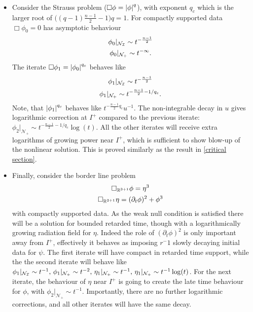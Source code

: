 \documentclass[11pt, oneside]{amsart}
\begin{document}
\begin{itemize}
		\item Consider the Strauss problem ($\Box\phi=\left\lvert \phi\right\rvert^q$), with exponent $q_c$ which is the larger root of ${\big((q-1)\frac{n-1}{2}-1\big)q=1}$. For compactly supported data $\Box\phi_0=0$ has asymptotic behaviour 
		\begin{equation*}
			\begin{gathered}
				\phi_0|_{\mathcal{N}_{\mathcal{I}}}\sim t^{-\frac{n-1}{2}}\\
				\phi_0|_{\mathcal{N}_+}\sim t^{-\infty}.
			\end{gathered}
		\end{equation*}
		The iterate $\Box\phi_1=\left\lvert \phi_0\right\rvert^{q_c}$ behaves like
		\begin{equation*}
			\begin{gathered}
				\phi_1|_{\mathcal{N}_{\mathcal{I}}}\sim t^{-\frac{n-1}{2}}\\
				\phi_1|_{\mathcal{N}_+}\sim t^{-\frac{n-1}{2}-1/q_c}.
			\end{gathered}
		\end{equation*}
		Note, that $\left\lvert \phi_1\right\rvert^{q_c}$ behaves like $t^{-\frac{n-1}{2}q_c}u^{-1}$. The non-integrable decay in $u$ gives logarithmic correction at $I^+$ compared to the previous iterate: $\phi_2|_{\mathcal{N}_+}\sim t^{-\frac{n-1}{2}-1/q_c}\log(t)$.  All the other iterates will receive extra logarithms of growing power near $I^+$, which is sufficient to show blow-up of the nonlinear solution. This is proved similarly as the result in \cref{critical section}.
		\item  Finally, consider the border line problem
		\begin{equation*}
			\begin{gathered}
				\Box_{\mathbb{R}^{3+1}}\phi=\eta^3\\
				\Box_{\mathbb{R}^{3+1}}\eta=(\partial_t\phi)^2+\phi^3
			\end{gathered}
		\end{equation*}
		with compactly supported data. As the weak null condition is satisfied there will be a solution for bounded retarded time, though with a logarithmically growing radiation field for $\eta$. Indeed the role of $(\partial_t\phi)^2$ is only important away from $I^+$, effectively it behaves as imposing $r^-1$ slowly decaying initial data for $\psi$. The first iterate will have compact in retarded time support, while the the second iterate will behave like $\phi_1|_{\mathcal{N}_{\mathcal{I}}}\sim t^{-1},\,\phi_1|_{\mathcal{N}_+}\sim t^{-2},\,\eta_1|_{\mathcal{N}_+}\sim t^{-1},\,\eta_1|_{\mathcal{N}_+}\sim t^{-1}\log(t)$. For the next iterate, the behaviour of $\eta$ near $I^+$ is going to create the late time behaviour for $\phi$, with  $\phi_2|_{\mathcal{N}_+}\sim t^{-1}$. Importantly, there are no further logarithmic corrections, and all other iterates will have the same decay.
	\end{itemize}
\end{document}
